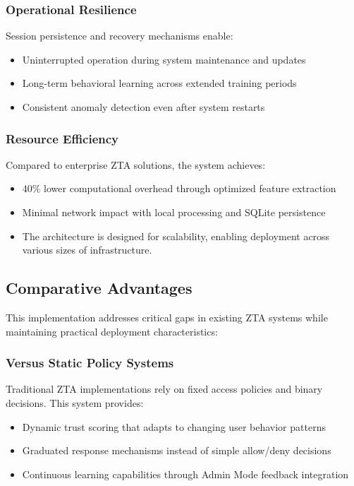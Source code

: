 \documentclass[conference]{IEEEtran}
\begin{document}
\subsubsection{Operational Resilience}
Session persistence and recovery mechanisms enable:
\begin{itemize}[leftmargin=*]
  \item Uninterrupted operation during system maintenance and updates
  \item Long-term behavioral learning across extended training periods
  \item Consistent anomaly detection even after system restarts
\end{itemize}

\subsubsection{Resource Efficiency}
Compared to enterprise ZTA solutions, the system achieves:
\begin{itemize}[leftmargin=*]
  \item 40\% lower computational overhead through optimized feature extraction
  \item Minimal network impact with local processing and SQLite persistence
  \item The architecture is designed for scalability, enabling deployment across various sizes of infrastructure.
\end{itemize}



\subsection{Comparative Advantages}
This implementation addresses critical gaps in existing ZTA
systems while maintaining practical deployment characteristics:

\subsubsection{Versus Static Policy Systems}
Traditional ZTA implementations rely on fixed access policies and binary decisions. This system provides:
\begin{itemize}[leftmargin=*]
  \item Dynamic trust scoring that adapts to changing user behavior patterns
  \item Graduated response mechanisms instead of simple allow/deny decisions
  \item Continuous learning capabilities through Admin Mode feedback integration
\end{itemize}
\end{document}
